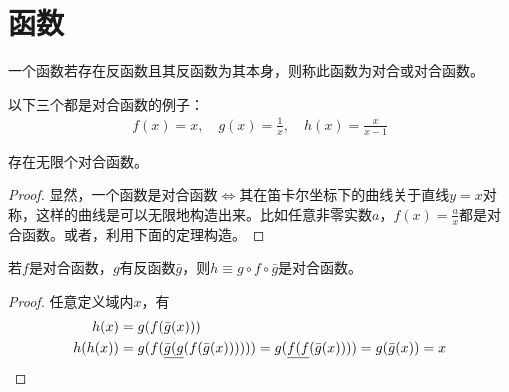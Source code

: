 
\chapter{函数}
\label{chap:function}

\begin{definition}[对合，Involution]
  一个函数若存在反函数且其反函数为其本身，则称此函数为对合或对合函数。
\end{definition}

\begin{example}
  以下三个都是对合函数的例子：
  \begin{align*}
    f(x)=x,\quad g(x)=\frac1x,\quad h(x)=\frac{x}{x-1}
  \end{align*}
\end{example}

\begin{example}
  存在无限个对合函数。
\end{example}
\begin{proof}
  显然，一个函数是对合函数$\iff$其在笛卡尔坐标下的曲线关于直线$y=x$对称，这样的曲线是可以无限地构造出来。比如任意非零实数$a$，$f(x)=\frac{a}{x}$都是对合函数。或者，利用下面的定理构造。
\end{proof}

\begin{theorem}
  若$f$是对合函数，$g$有反函数$\bar g$，则$h\equiv g\circ f\circ\bar g$是对合函数。
\end{theorem}
\begin{proof}
  任意定义域内$x$，有
  \begin{align*}
    h(x)&= g(f(\bar g(x)))\\
    h(h(x))&=g(f(\underline{\bar g( g}(f(\bar g(x))) ))) = g(\underline{f(f}(\bar g(x)))) = g(\bar g(x)) = x \qedhere
  \end{align*}
\end{proof}
